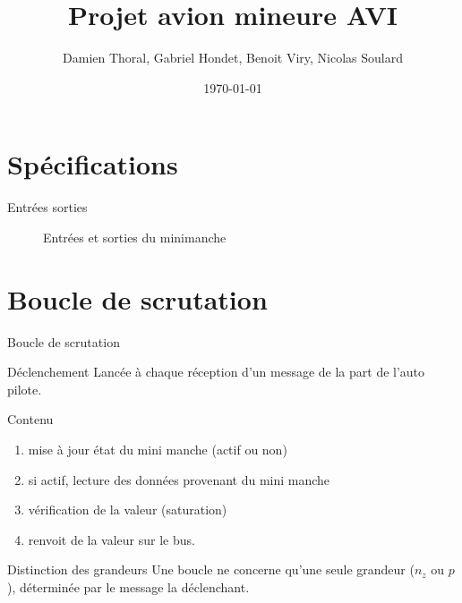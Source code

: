 \documentclass[footheight=2em]{beamer}
\title{Projet avion mineure AVI}
\author{Damien Thoral, Gabriel Hondet, Benoit Viry, Nicolas Soulard}
\date{\today}
\begin{document}
\frame{\titlepage}


\section{Spécifications}
\begin{frame}[t]{Entrées sorties}
  \begin{scriptsize}
    \begin{figure}
      \centering
      \caption{Entrées et sorties du minimanche}
      \label{fig:io}
    \end{figure}
  \end{scriptsize}
\end{frame}

\section{Boucle de scrutation}
\begin{frame}[t]{Boucle de scrutation}
  \begin{block}{Déclenchement}
    Lancée à chaque réception d'un message de la part de l'auto pilote.
  \end{block}

  \begin{block}{Contenu}
    \begin{enumerate}
      \item mise à jour état du mini manche (actif ou non)
      \item si actif, lecture des données provenant du mini manche
      \item vérification de la valeur (saturation)
      \item renvoit de la valeur sur le bus.
    \end{enumerate}
  \end{block}

  \begin{block}{Distinction des grandeurs}
    Une boucle ne concerne qu'une seule grandeur (\(n_z\) ou \(p\)),
    déterminée par le message la déclenchant.
  \end{block}
\end{frame}
\end{document}
